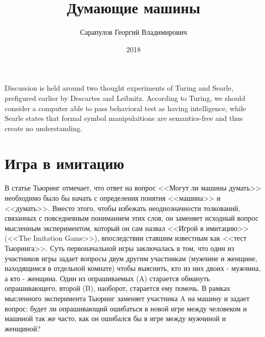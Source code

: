 \documentclass[12pt, specialist, subf, substylefile = spbu.rtx]{disser}
\begin{document}

\title{Думающие машины}


\author{Сарапулов Георгий Владимирович}


\date{2018}

\maketitle


\tableofcontents

\intro
Discussion is held around two thought experiments of Turing and Searle, prefigured earlier by Descartes and Leibnitz. According to Turing, we should consider a computer able to pass behavioral test as having intelligence, while Searle states that formal symbol manipulaitions are semantics-free and thus create no understanding. 

\cite{turing1950computing}
\cite{Searle80minds}


\chapter{Игра в имитацию}
\label{sec:turing}

В статье \cite{turing1950computing} Тьюринг отмечает, что ответ на вопрос <<Могут ли машины думать>> необходимо было бы начать с определения понятия <<машина>> и <<думать>>. Вместо этого, чтобы избежать неоднозначности толкований, связанных с повседневным пониманием этих слов, он заменяет исходный вопрос мысленным экспериментом, который он сам назвал <<Игрой в имитацию>> (<<The Imitation Game>>), впоследствии ставшим известным как <<тест Тьюринга>>. Суть первоначальной игры заключалась в том, что один из участников игры задает вопросы двум другим участникам (мужчине и женщине, находящимся в отдельной комнате) чтобы выяснить, кто из них двоих - мужчина, а кто - женщина. Один из опрашиваемых (A) старается обмануть опрашивающего, второй (B), наоборот, старается ему помочь. В рамках мысленного эксперимента Тьюринг заменяет участника A на машину и задает вопрос: будет ли опрашивающий ошибаться в новой игре между человеком и машиной так же часто, как он ошибался бы в игре между мужчиной и женщиной?
\end{document}

